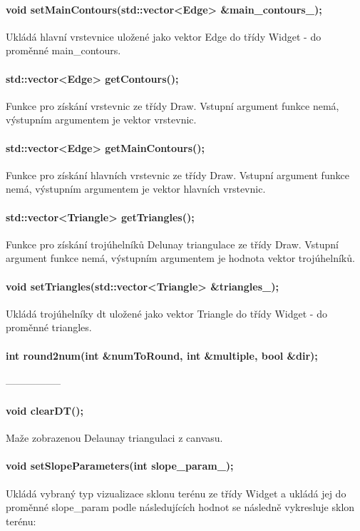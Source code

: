 \documentclass[11pt]{article}
\begin{document}
\paragraph {void setMainContours(std::vector<Edge> \&main\_contours\_);}
Ukládá hlavní vrstevnice uložené jako vektor Edge do třídy Widget - do proměnné main\_contours.

\paragraph {std::vector<Edge> getContours();}
Funkce pro získání vrstevnic ze třídy Draw. Vstupní argument funkce nemá, výstupním argumentem je vektor vrstevnic.

\paragraph {std::vector<Edge> getMainContours();}
Funkce pro získání hlavních vrstevnic ze třídy Draw. Vstupní argument funkce nemá, výstupním argumentem je vektor hlavních vrstevnic.

\paragraph {std::vector<Triangle> getTriangles();}
Funkce pro získání trojúhelníků Delunay triangulace ze třídy Draw. Vstupní argument funkce nemá, výstupním argumentem je hodnota vektor trojúhelníků.

\paragraph {void setTriangles(std::vector<Triangle> \&triangles\_);}
Ukládá trojúhelníky dt uložené jako vektor Triangle do třídy Widget - do proměnné triangles.

\paragraph{int round2num(int \&numToRound, int \&multiple, bool \&dir);} 
-----------------

\paragraph {void clearDT();}
Maže zobrazenou Delaunay triangulaci z canvasu.

\paragraph {void setSlopeParameters(int slope\_param\_);}
Ukládá vybraný typ vizualizace sklonu terénu ze třídy Widget a ukládá jej do proměnné slope\_param podle následujících hodnot se následně vykresluje sklon terénu: 
\end{document}

